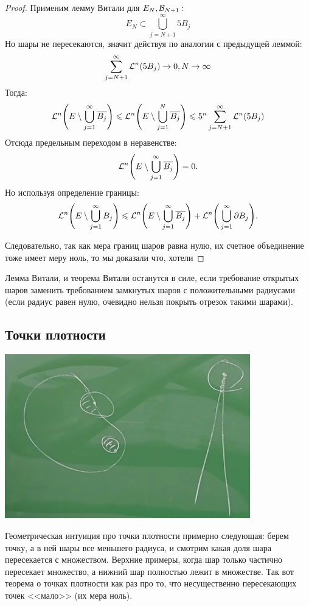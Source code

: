 \begin{proof}
    
    Применим лемму Витали для $E_N, \mathcal{B}_{N + 1}:$
        $$E_N \subset \bigcup_{j = N + 1}^{\infty} 5B_j$$
        Но шары не пересекаются, значит действуя по аналогии с предыдущей леммой:
        $$\sum_{j = N + 1}^{\infty}\mathcal{L}^n(5B_j) \rightarrow 0, N \rightarrow \infty$$
        Тогда:
        $$\mathcal{L}^n\Bigg(E \setminus \bigcup_{j =1}^{\infty} \overline{B_j}\Bigg) \leqslant \mathcal{L}^n\Bigg(E \setminus \bigcup_{j =1}^{N} \overline{B_j}\Bigg) \leqslant 5^n \sum_{j = N + 1}^{\infty}\mathcal{L}^n(5B_j)$$
        Отсюда предельным переходом в неравенстве:
        $$\mathcal{L}^n\Bigg(E \setminus \bigcup_{j =1}^{\infty} \overline{B_j}\Bigg) = 0.$$
        Но используя определение границы:
        $$\mathcal{L}^n\Bigg(E \setminus \bigcup_{j =1}^{\infty} B_j\Bigg) \leqslant \mathcal{L}^n\Bigg(E \setminus \bigcup_{j =1}^{\infty} \overline{B_j}\Bigg) + \mathcal{L}^n\Bigg( \bigcup_{j =1}^{\infty} \partial B_j \Bigg).$$
        
        Следовательно, так как мера границ шаров равна нулю, их счетное объединение тоже имеет меру ноль, то мы доказали что, хотели
\end{proof}
\begin{note}
    Лемма Витали, и теорема Витали останутся в силе, если требование открытых шаров заменить требованием замкнутых шаров с положительными радиусами (если радиус равен нулю, очевидно нельзя покрыть отрезок такими шарами).
\end{note}

\subsection{Точки плотности}

\begin{minipage}{0.5\textwidth}%
    \includegraphics[width=0.8\textwidth]{images/Screenshot_6.png} 
\end{minipage}%
\hfill%
\begin{minipage}{0.5\textwidth}\raggedright
Геометрическая интуиция про точки плотности примерно следующая: берем точку, а в ней шары все меньшего радиуса, и смотрим какая доля шара пересекается с множеством. Верхние примеры, когда шар только частично пересекает множество, а нижний шар полностью лежит в множестве. Так вот теорема о точках плотности как раз про то, что несущественно пересекающих точек <<мало>> (их мера ноль).
\end{minipage}

